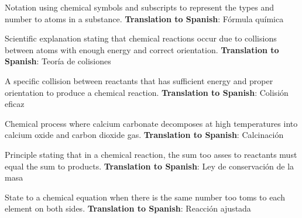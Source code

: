 \begin{vocabulary}
      Notation using chemical symbols and subscripts to represent the types and number to atoms in a substance. \newline
       \textbf{Translation to Spanish}: Fórmula química \newline
\end{vocabulary}

\begin{vocabulary}
      Scientific explanation stating that chemical reactions occur due to collisions between atoms with enough energy and correct orientation. \newline
       \textbf{Translation to Spanish}: Teoría de colisiones \newline
\end{vocabulary}

\begin{vocabulary}
      A specific collision between reactants that has sufficient energy and proper orientation to produce a chemical reaction. \newline
       \textbf{Translation to Spanish}: Colisión eficaz \newline
\end{vocabulary}

\begin{vocabulary}[Calcination]
      Chemical process where calcium carbonate decomposes at high temperatures into calcium oxide and carbon dioxide gas. \newline
       \textbf{Translation to Spanish}: Calcinación \newline
\end{vocabulary}

\begin{vocabulary}
      Principle stating that in a chemical reaction, the sum too asses to reactants must equal the sum to products. \newline
       \textbf{Translation to Spanish}: Ley de conservación de la masa \newline
\end{vocabulary}

\begin{vocabulary}
      State to a chemical equation when there is the same number too toms to each element on both sides. \newline
       \textbf{Translation to Spanish}: Reacción ajustada \newline
\end{vocabulary}

